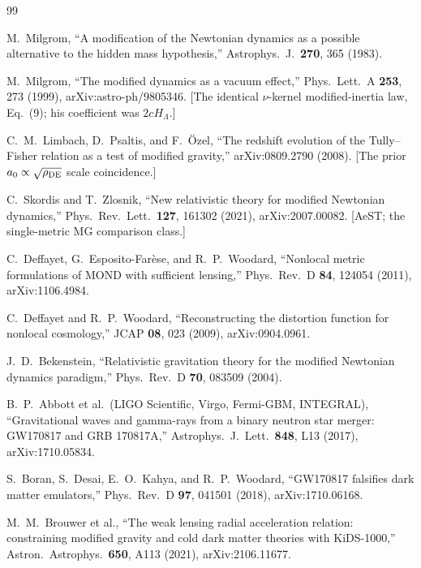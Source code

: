 \documentclass[11pt]{article}
\begin{document}
\begin{thebibliography}{99}

 M.\ Milgrom, ``A modification of the Newtonian dynamics as a possible alternative to the hidden mass hypothesis,'' Astrophys.\ J.\ \textbf{270}, 365 (1983).

 M.\ Milgrom, ``The modified dynamics as a vacuum effect,'' Phys.\ Lett.\ A \textbf{253}, 273 (1999), arXiv:astro-ph/9805346. [The identical $\nu$-kernel modified-inertia law, Eq.~(9); his coefficient was $2cH_\Lambda$.]

 C.\ M.\ Limbach, D.\ Psaltis, and F.\ \"Ozel, ``The redshift evolution of the Tully--Fisher relation as a test of modified gravity,'' arXiv:0809.2790 (2008). [The prior $a_0\propto\sqrt{\rho_{\rm DE}}$ scale coincidence.]

 C.\ Skordis and T.\ Zlosnik, ``New relativistic theory for modified Newtonian dynamics,'' Phys.\ Rev.\ Lett.\ \textbf{127}, 161302 (2021), arXiv:2007.00082. [AeST; the single-metric MG comparison class.]

 C.\ Deffayet, G.\ Esposito-Far\`ese, and R.\ P.\ Woodard, ``Nonlocal metric formulations of MOND with sufficient lensing,'' Phys.\ Rev.\ D \textbf{84}, 124054 (2011), arXiv:1106.4984.

 C.\ Deffayet and R.\ P.\ Woodard, ``Reconstructing the distortion function for nonlocal cosmology,'' JCAP \textbf{08}, 023 (2009), arXiv:0904.0961.

 J.\ D.\ Bekenstein, ``Relativistic gravitation theory for the modified Newtonian dynamics paradigm,'' Phys.\ Rev.\ D \textbf{70}, 083509 (2004).

 B.\ P.\ Abbott et al.\ (LIGO Scientific, Virgo, Fermi-GBM, INTEGRAL), ``Gravitational waves and gamma-rays from a binary neutron star merger: GW170817 and GRB 170817A,'' Astrophys.\ J.\ Lett.\ \textbf{848}, L13 (2017), arXiv:1710.05834.

 S.\ Boran, S.\ Desai, E.\ O.\ Kahya, and R.\ P.\ Woodard, ``GW170817 falsifies dark matter emulators,'' Phys.\ Rev.\ D \textbf{97}, 041501 (2018), arXiv:1710.06168.

 M.\ M.\ Brouwer et al., ``The weak lensing radial acceleration relation: constraining modified gravity and cold dark matter theories with KiDS-1000,'' Astron.\ Astrophys.\ \textbf{650}, A113 (2021), arXiv:2106.11677.


\end{thebibliography}
\end{document}
